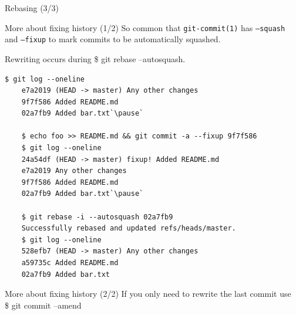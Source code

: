 {\begin{frame}[fragile]{Rebasing (3/3)}
\end{frame}
}

\begin{frame}[fragile]{More about fixing history (1/2)}
  So common that \texttt{git-commit(1)} has \texttt{--squash} and \texttt{--fixup} to mark commits to be automatically squashed.\par
  Rewriting occurs during {\ttfamily\scriptsize\$ git rebase --autosquash}.
  \pause
  \begin{lstlisting}[style=bash]
    $ git log --oneline
    e7a2019 (HEAD -> master) Any other changes
    9f7f586 Added README.md
    02a7fb9 Added bar.txt`\pause`

    $ echo foo >> README.md && git commit -a --fixup 9f7f586
    $ git log --oneline
    24a54df (HEAD -> master) fixup! Added README.md
    e7a2019 Any other changes
    9f7f586 Added README.md
    02a7fb9 Added bar.txt`\pause`

    $ git rebase -i --autosquash 02a7fb9
    Successfully rebased and updated refs/heads/master.
    $ git log --oneline
    528efb7 (HEAD -> master) Any other changes
    a59735c Added README.md
    02a7fb9 Added bar.txt
  \end{lstlisting}
\end{frame}

\begin{frame}{More about fixing history (2/2)}
  If you only need to rewrite the last commit use\\ {\ttfamily\scriptsize\$ git commit --amend}

  \gitRebaseWarning
\end{frame}

